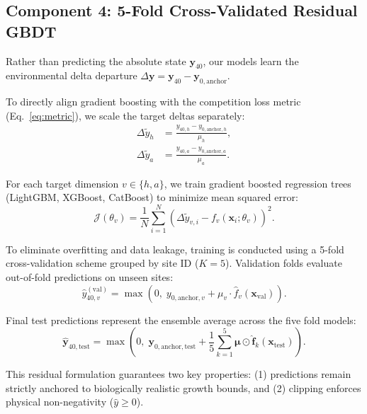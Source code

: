 \documentclass[conference]{IEEEtran}
\begin{document}
\subsection{Component 4: 5-Fold Cross-Validated Residual GBDT}
Rather than predicting the absolute state $\mathbf{y}_{40}$, our models learn the environmental delta departure $\Delta \mathbf{y} = \mathbf{y}_{40} - \mathbf{y}_{0,\text{anchor}}$.

To directly align gradient boosting with the competition loss metric (Eq.~\ref{eq:metric}), we scale the target deltas separately:
\begin{align}
    \Delta \tilde{y}_h &= \frac{y_{40,h} - y_{0,\text{anchor},h}}{\mu_h}, \label{eq:delta_h} \\[5pt]
    \Delta \tilde{y}_a &= \frac{y_{40,a} - y_{0,\text{anchor},a}}{\mu_a}. \label{eq:delta_a}
\end{align}

For each target dimension $v \in \{h, a\}$, we train gradient boosted regression trees (LightGBM, XGBoost, CatBoost) to minimize mean squared error:
\begin{equation}
    \mathcal{J}(\theta_v) = \frac{1}{N} \sum_{i=1}^N \left( \Delta \tilde{y}_{v,i} - f_v(\mathbf{x}_i; \theta_v) \right)^2.
\end{equation}

To eliminate overfitting and data leakage, training is conducted using a 5-fold cross-validation scheme grouped by site ID ($K=5$). Validation folds evaluate out-of-fold predictions on unseen sites:
\begin{equation}
    \hat{y}_{40, v}^{(\text{val})} = \max\left(0, \; y_{0,\text{anchor},v} + \mu_v \cdot \hat{f}_v(\mathbf{x}_{\text{val}})\right).
\end{equation}

Final test predictions represent the ensemble average across the five fold models:
\begin{equation}
    \hat{\mathbf{y}}_{40,\text{test}} = \max\left(0, \; \mathbf{y}_{0,\text{anchor},\text{test}} + \frac{1}{5} \sum_{k=1}^5 \boldsymbol{\mu} \odot \hat{\mathbf{f}}_k(\mathbf{x}_{\text{test}})\right).
\end{equation}

This residual formulation guarantees two key properties: (1) predictions remain strictly anchored to biologically realistic growth bounds, and (2) clipping enforces physical non-negativity ($\hat{y} \ge 0$).

\end{document}
